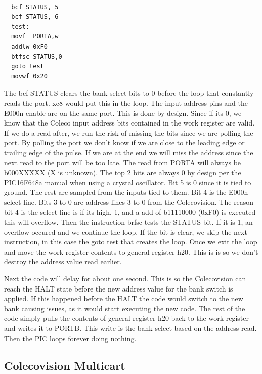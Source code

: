\documentclass{article}
\begin{document}
  \begin{lstlisting}[language={[xc8]Assembler}]

  bcf STATUS, 5
  bcf STATUS, 6
  test:
  movf  PORTA,w
  addlw 0xF0
  btfsc STATUS,0
  goto test
  movwf 0x20
  \end{lstlisting}

  \par
  The bcf STATUS clears the bank select bits to 0 before the loop that constantly reads the port. xc8 would put this in the loop.
  The input address pins and the E000n enable are on the same port. This is done by design. Since if its 0, we know that the Coleco input address bits
  contained in the work register are valid. If we do a read after, we run the risk of missing the bits since we are polling the port.
  By polling the port we don't know if we are close to the leading edge or trailing edge of the pulse. If we are at the end we will miss the
  address since the next read to the port will be too late. The read from PORTA will always be b000XXXXX (X is unknown). The top 2 bits
  are always 0 by design per the PIC16F648a manual when using a crystal oscillator. Bit 5 is 0 since it is tied to ground. The rest are sampled
  from the inputs tied to them. Bit 4 is the E000n select line. Bits 3 to 0 are address lines 3 to 0 from the Colecovision. The reason bit 4 is
  the select line is if its high, 1, and a add of b11110000 (0xF0) is executed this will overflow. Then the instruction brfsc tests the STATUS bit.
  If it is 1, an overflow occured and we continue the loop. If the bit is clear, we skip the next instruction, in this case the goto test that creates the loop.
  Once we exit the loop and move the work register contents to general register h20. This is is so we don't destroy the address value read earlier.

  \par
  Next the code will delay for about one second. This is so the Colecovision can reach the HALT state before the new address value for the
  bank switch is applied. If this happened before the HALT the code would switch to the new bank causing issues, as it would start executing
  the new code. The rest of the code simply pulls the contents of general register h20 back to the work register and writes it to PORTB. This write
  is the bank select based on the address read. Then the PIC loops forever doing nothing.

  \subsection{Colecovision Multicart} \label{Colecovision Multicart}
\end{document}
